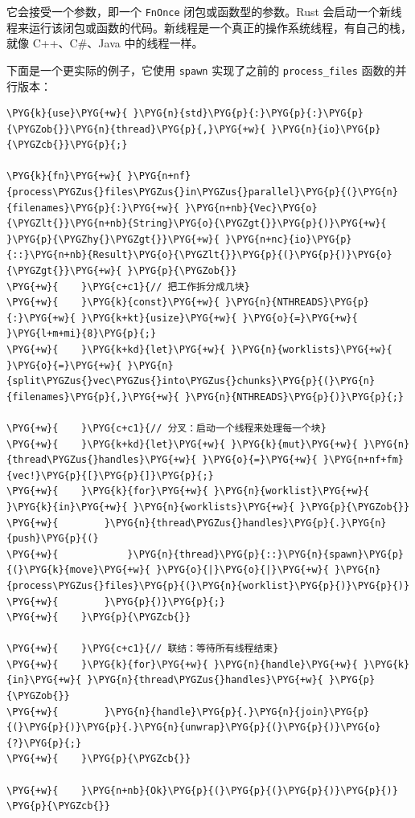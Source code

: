 它会接受一个参数，即一个 \texttt{FnOnce} 闭包或函数型的参数。Rust 会启动一个新线程来运行该闭包或函数的代码。新线程是一个真正的操作系统线程，有自己的栈，就像 C++、C\#、Java 中的线程一样。

下面是一个更实际的例子，它使用 \texttt{spawn} 实现了之前的 \texttt{process\_files} 函数的并行版本：

\begin{Verbatim}[commandchars=\\\{\},breaklines=true,breakanywhere=true,fontsize=\codefont,xleftmargin=17bp]
\PYG{k}{use}\PYG{+w}{ }\PYG{n}{std}\PYG{p}{:}\PYG{p}{:}\PYG{p}{\PYGZob{}}\PYG{n}{thread}\PYG{p}{,}\PYG{+w}{ }\PYG{n}{io}\PYG{p}{\PYGZcb{}}\PYG{p}{;}

\PYG{k}{fn}\PYG{+w}{ }\PYG{n+nf}{process\PYGZus{}files\PYGZus{}in\PYGZus{}parallel}\PYG{p}{(}\PYG{n}{filenames}\PYG{p}{:}\PYG{+w}{ }\PYG{n+nb}{Vec}\PYG{o}{\PYGZlt{}}\PYG{n+nb}{String}\PYG{o}{\PYGZgt{}}\PYG{p}{)}\PYG{+w}{ }\PYG{p}{\PYGZhy{}\PYGZgt{}}\PYG{+w}{ }\PYG{n+nc}{io}\PYG{p}{::}\PYG{n+nb}{Result}\PYG{o}{\PYGZlt{}}\PYG{p}{(}\PYG{p}{)}\PYG{o}{\PYGZgt{}}\PYG{+w}{ }\PYG{p}{\PYGZob{}}
\PYG{+w}{    }\PYG{c+c1}{// 把工作拆分成几块}
\PYG{+w}{    }\PYG{k}{const}\PYG{+w}{ }\PYG{n}{NTHREADS}\PYG{p}{:}\PYG{+w}{ }\PYG{k+kt}{usize}\PYG{+w}{ }\PYG{o}{=}\PYG{+w}{ }\PYG{l+m+mi}{8}\PYG{p}{;}
\PYG{+w}{    }\PYG{k+kd}{let}\PYG{+w}{ }\PYG{n}{worklists}\PYG{+w}{ }\PYG{o}{=}\PYG{+w}{ }\PYG{n}{split\PYGZus{}vec\PYGZus{}into\PYGZus{}chunks}\PYG{p}{(}\PYG{n}{filenames}\PYG{p}{,}\PYG{+w}{ }\PYG{n}{NTHREADS}\PYG{p}{)}\PYG{p}{;}

\PYG{+w}{    }\PYG{c+c1}{// 分叉：启动一个线程来处理每一个块}
\PYG{+w}{    }\PYG{k+kd}{let}\PYG{+w}{ }\PYG{k}{mut}\PYG{+w}{ }\PYG{n}{thread\PYGZus{}handles}\PYG{+w}{ }\PYG{o}{=}\PYG{+w}{ }\PYG{n+nf+fm}{vec!}\PYG{p}{[}\PYG{p}{]}\PYG{p}{;}
\PYG{+w}{    }\PYG{k}{for}\PYG{+w}{ }\PYG{n}{worklist}\PYG{+w}{ }\PYG{k}{in}\PYG{+w}{ }\PYG{n}{worklists}\PYG{+w}{ }\PYG{p}{\PYGZob{}}
\PYG{+w}{        }\PYG{n}{thread\PYGZus{}handles}\PYG{p}{.}\PYG{n}{push}\PYG{p}{(}
\PYG{+w}{            }\PYG{n}{thread}\PYG{p}{::}\PYG{n}{spawn}\PYG{p}{(}\PYG{k}{move}\PYG{+w}{ }\PYG{o}{|}\PYG{o}{|}\PYG{+w}{ }\PYG{n}{process\PYGZus{}files}\PYG{p}{(}\PYG{n}{worklist}\PYG{p}{)}\PYG{p}{)}
\PYG{+w}{        }\PYG{p}{)}\PYG{p}{;}
\PYG{+w}{    }\PYG{p}{\PYGZcb{}}

\PYG{+w}{    }\PYG{c+c1}{// 联结：等待所有线程结束}
\PYG{+w}{    }\PYG{k}{for}\PYG{+w}{ }\PYG{n}{handle}\PYG{+w}{ }\PYG{k}{in}\PYG{+w}{ }\PYG{n}{thread\PYGZus{}handles}\PYG{+w}{ }\PYG{p}{\PYGZob{}}
\PYG{+w}{        }\PYG{n}{handle}\PYG{p}{.}\PYG{n}{join}\PYG{p}{(}\PYG{p}{)}\PYG{p}{.}\PYG{n}{unwrap}\PYG{p}{(}\PYG{p}{)}\PYG{o}{?}\PYG{p}{;}
\PYG{+w}{    }\PYG{p}{\PYGZcb{}}

\PYG{+w}{    }\PYG{n+nb}{Ok}\PYG{p}{(}\PYG{p}{(}\PYG{p}{)}\PYG{p}{)}
\PYG{p}{\PYGZcb{}}
\end{Verbatim}

